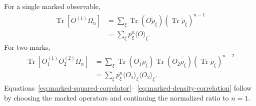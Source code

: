 \documentclass[
  aps,prx,twocolumn,superscriptaddress,longbibliography,
  nofootinbib,floatfix
]{revtex4-2}
\newcommand{\Tr}{\operatorname{Tr}}
\theoremstyle{plain}
\theoremstyle{definition}
\begin{document}
For a single marked observable,
\begin{align}
 \Tr[O^{(1)}\Omega_n]
 &=\sum_\xi
 \Tr(O\widetilde\rho_\xi)
 (\Tr\widetilde\rho_\xi)^{n-1}
 \nonumber\\
 &=\sum_\xi p_\xi^n\langle O\rangle_\xi.
 \label{eq:app-one-mark}
\end{align}
For two marks,
\begin{align}
 \Tr[O_1^{(1)}O_2^{(2)}\Omega_n]
 &=\sum_\xi
 \Tr(O_1\widetilde\rho_\xi)
 \Tr(O_2\widetilde\rho_\xi)
 (\Tr\widetilde\rho_\xi)^{n-2}
 \nonumber\\
 &=\sum_\xi p_\xi^n
 \langle O_1\rangle_\xi\langle O_2\rangle_\xi.
 \label{eq:app-two-marks}
\end{align}
Equations~\eqref{eq:marked-squared-correlator}--
\eqref{eq:marked-density-correlation} follow by choosing the marked
operators and continuing the normalized ratio to \(n=1\).



\end{document}
